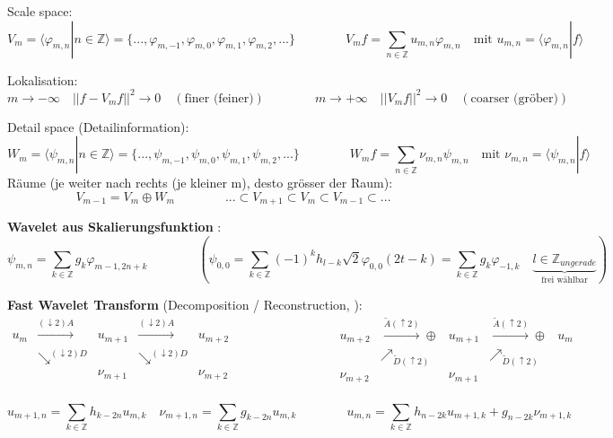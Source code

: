 Scale space: 
\[
	V_m = \langle \varphi_{m,n}|n \in \mathbb{Z}  \rangle = \{ ...,\varphi_{m,-1},\varphi_{m,0}, \varphi_{m,1}, \varphi_{m,2},... \}
	\qquad \qquad
	V_mf = \sum_{n \in \mathbb{Z}} u_{m,n}\varphi_{m,n} \quad \text{mit } u_{m,n}=\langle \varphi_{m,n}|f \rangle
\]

Lokalisation:
\[  
	m \rightarrow -\infty \quad ||f-V_mf||^2 \rightarrow 0 \quad (\text{finer (feiner)})
	\qquad \qquad
	m \rightarrow +\infty \quad ||V_mf||^2 \rightarrow 0 \quad (\text{coarser (gröber)})
\]

Detail space (Detailinformation):
\[
	W_m = \langle \psi_{m,n} | n \in \mathbb{Z} \rangle = \{ ...,\psi_{m,-1},\psi_{m,0}, \psi_{m,1}, \psi_{m,2},... \}
	\qquad \qquad
	W_mf = \sum_{n \in \mathbb{Z}} \nu_{m,n}\psi_{m,n} \quad \text{mit } \nu_{m,n}=\langle \psi_{m,n}|f \rangle
\]
Räume (je weiter nach rechts (je kleiner m), desto grösser der Raum):
\[ V_{m-1} = V_m \oplus W_m  \qquad \qquad ...\subset V_{m+1} \subset V_{m} \subset V_{m-1} \subset ... \]

\textbf{Wavelet aus Skalierungsfunktion} :
\[
	\psi_{m,n} = \sum_{k \in \mathbb{Z}} g_k \varphi_{m-1,2n+k} 
	\qquad \qquad 
	\left(\psi_{0,0}=\sum_{k \in \mathbb{Z}} (-1)^k h_{l-k} \sqrt{2}  \varphi_{0,0}(2t-k) = \sum_{k \in \mathbb{Z}} g_k \varphi_{-1,k} \quad \underbrace{l \in \mathbb{Z}_{ungerade}}_{\text{frei wählbar}} \right)
\]

\textbf{Fast Wavelet Transform} (Decomposition / Reconstruction, ):
\[
	\boxed{\begin{array}{ccccc}
		u_m & \xrightarrow{(\downarrow 2)A} & u_{m+1} & \xrightarrow{(\downarrow 2)A} & u_{m+2} \\
		& \searrow^{(\downarrow 2)D} & & \searrow^{(\downarrow 2)D} & \\
		& & \nu_{m+1} & & \nu_{m+2} \\
	\end{array}}
	\qquad \qquad \qquad \qquad
	\boxed{\begin{array}{ccccc}
		u_{m+2} & \xrightarrow{\tilde{A}(\uparrow 2)} \oplus& u_{m+1} & \xrightarrow{\tilde{A}(\uparrow 2)} \oplus & u_{m} \\
		& \nearrow_{\tilde{D} (\uparrow 2)} & & \nearrow_{\tilde{D} (\uparrow 2)} & \\
		\nu_{m+2}& & \nu_{m+1} & & \\
	\end{array}}
\]

\[  
	u_{m+1,n} = \sum_{k \in  \mathbb{Z}} h_{k-2n} u_{m,k} \quad \nu_{m+1,n} = \sum_{k \in  \mathbb{Z}} g_{k-2n} u_{m,k}
	\qquad \qquad
	u_{m,n} = \sum_{k \in  \mathbb{Z}} h_{n-2k} u_{m+1,k} + g_{n-2k} \nu_{m+1,k}
\]

